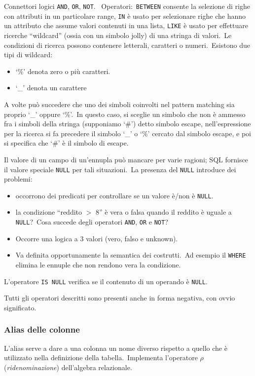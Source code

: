 \noindent Connettori logici \texttt{AND}, \texttt{OR}, \texttt{NOT}.\
\newpage
\noindent Operatori:\ \texttt{BETWEEN} consente la selezione di righe con attributi in un particolare
range, \texttt{IN} è usato per selezionare righe che hanno un attributo che assume valori contenuti in una lista, \texttt{LIKE} è usato per effettuare ricerche ``wildcard'' (ossia con un simbolo jolly) di una stringa di valori.\ Le condizioni di ricerca possono contenere letterali, caratteri o numeri.\
Esistono due tipi di wildcard:
\begin{itemize}
	\item `\%' denota zero o più caratteri.
	\item `\_' denota un carattere
\end{itemize}
A volte può succedere che uno dei simboli coinvolti nel pattern matching sia proprio `\_' oppure `\%'.\
In questo caso, si sceglie un simbolo che non è ammesso fra i simboli della stringa (supponiamo `\#') detto simbolo escape, nell'espressione per la ricerca si fa precedere il simbolo `\_' o `\%' cercato dal simbolo escape, e poi si specifica che `\#' è il simbolo di escape.

Il valore di un campo di un'ennupla può mancare per varie ragioni; SQL fornisce il valore speciale \texttt{NULL} per tali situazioni.\
La presenza del \texttt{NULL} introduce dei problemi:
\begin{itemize}
	\item occorrono dei predicati per controllare se un valore è/non è \texttt{NULL}.
	\item la condizione ``reddito $>$ 8'' è vera o falsa quando il reddito è uguale a \texttt{NULL}?\ Cosa succede degli operatori \texttt{AND}, \texttt{OR} e \texttt{NOT}?
	\item Occorre una logica a 3 valori (vero, falso e unknown).
	\item Va definita opportunamente la semantica dei costrutti.\ Ad esempio il \texttt{WHERE} elimina le ennuple che non rendono vera la condizione.
\end{itemize}
L'operatore \texttt{IS NULL} verifica se il contenuto di un operando è \texttt{NULL}.\

Tutti gli operatori descritti sono presenti anche in forma negativa, con ovvio significato.

\subsubsection{Alias delle colonne}
L'alias serve a dare a una colonna un nome diverso rispetto a quello che è utilizzato nella definizione della tabella.\
Implementa l'operatore $\rho$ (\textit{ridenominazione}) dell'algebra relazionale.

